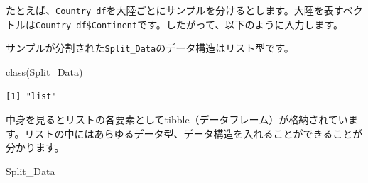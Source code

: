 \documentclass[
  a4paper,
  pandoc,
  ja=standard,
  jafont=haranoaji]{bxjsbook}
\newenvironment{Shaded}{\begin{snugshade}}{\end{snugshade}}
\newcommand{\FunctionTok}[1]{\textcolor[rgb]{0.28,0.35,0.67}{#1}}
\newcommand{\NormalTok}[1]{\textcolor[rgb]{0.00,0.48,0.65}{#1}}
\newcommand{\OtherTok}[1]{\textcolor[rgb]{0.00,0.48,0.65}{#1}}
\newcommand{\SpecialCharTok}[1]{\textcolor[rgb]{0.37,0.37,0.37}{#1}}
\begin{document}
たとえば、\texttt{Country\_df}を大陸ごとにサンプルを分けるとします。大陸を表すベクトルは\texttt{Country\_df\$Continent}です。したがって、以下のように入力します。

\begin{Shaded}
\end{Shaded}

サンプルが分割された\texttt{Split\_Data}のデータ構造はリスト型です。

\begin{Shaded}
\begin{Highlighting}[numbers=left,,]
\FunctionTok{class}\NormalTok{(Split\_Data)}
\end{Highlighting}
\end{Shaded}

\begin{verbatim}
[1] "list"
\end{verbatim}

中身を見るとリストの各要素としてtibble（データフレーム）が格納されています。リストの中にはあらゆるデータ型、データ構造を入れることができることが分かります。

\begin{Shaded}
\begin{Highlighting}[numbers=left,,]
\NormalTok{Split\_Data}
\end{Highlighting}
\end{Shaded}
\end{document}
